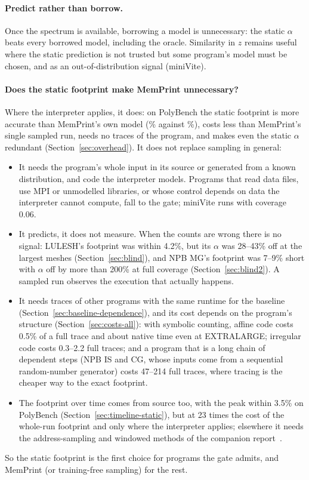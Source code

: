 \documentclass[11pt]{article}
\newcommand{\memprint}{MemPrint}
\newcommand{\secref}[1]{Section~\ref{#1}}
\newcommand{\zhat}{\hat z}
\begin{document}
\paragraph{Predict rather than borrow.}
Once the spectrum is available, borrowing a model is unnecessary: the static $\alpha$ beats every borrowed model,
including the oracle. Similarity in $\zhat$ remains useful where the static prediction is not trusted but some
program's model must be chosen, and as an out-of-distribution signal (miniVite).

\paragraph{Does the static footprint make \memprint{} unnecessary?}
Where the interpreter applies, it does: on PolyBench the static footprint is more accurate than \memprint{}'s own
model (\numfpExtra\% against \numownExtra\%), costs less than \memprint{}'s single sampled run, needs no traces of the
program, and makes even the static $\alpha$ redundant (\secref{sec:overhead}). It does not replace sampling in general:
\begin{itemize}
\item It needs the program's whole input in its source or generated from a known distribution, and code the interpreter
models. Programs that read data files, use MPI or unmodelled libraries, or whose control depends on data the
interpreter cannot compute, fall to the gate; miniVite runs with coverage 0.06.
\item It predicts, it does not measure. When the counts are wrong there is no signal: LULESH's footprint was within
4.2\%, but its $\alpha$ was 28--43\% off at the largest meshes (\secref{sec:blind}), and NPB MG's footprint was
7--9\% short with $\alpha$ off by more than 200\% at full coverage (\secref{sec:blind2}). A sampled run observes the
execution that actually happens.
\item It needs traces of other programs with the same runtime for the baseline (\secref{sec:baseline-dependence}), and
its cost depends on the program's structure (\secref{sec:costs-all}): with symbolic counting, affine code costs 0.5\%
of a full trace and about native time even at EXTRALARGE; irregular code costs 0.3--2.2 full traces; and a program
that is a long chain of dependent steps (NPB IS and CG, whose inputs come from a sequential random-number
generator) costs 47--214 full traces, where tracing is the cheaper way to the exact footprint.
\item The footprint over time comes from source too, with the peak within 3.5\% on PolyBench
(\secref{sec:timeline-static}), but at 23 times the cost of the whole-run footprint and only where the interpreter
applies; elsewhere it needs the address-sampling and windowed methods of the companion report~\cite{timeline2026}.
\end{itemize}
So the static footprint is the first choice for programs the gate admits, and \memprint{} (or training-free sampling)
for the rest.
\end{document}
